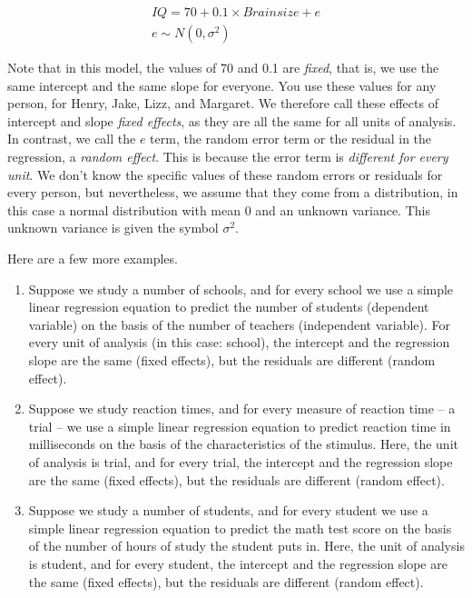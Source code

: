 \documentclass[]{book}\usepackage[]{graphicx}\usepackage[]{color}
\begin{document}
\begin{eqnarray}
IQ = 70 + 0.1 \times Brainsize + e \\
e \sim N(0, \sigma^2)
\end{eqnarray}

Note that in this model, the values of 70 and 0.1 are \textit{fixed}, that is, we use the same intercept and the same slope for everyone. You use these values for any person, for Henry, Jake, Lizz, and Margaret. We therefore call these effects of intercept and slope \textit{fixed effects}, as they are all the same for all units of analysis. In contrast, we call the $e$ term, the random error term or the residual in the regression, a \textit{random effect}. This is because the error term is \textit{different for every unit}. We don't know the specific values of these random errors or residuals for every person, but nevertheless, we assume that they come from a distribution, in this case a normal distribution with mean 0 and an unknown variance. This unknown variance is given the symbol $\sigma^2$. 

Here are a few more examples. 

\begin{enumerate}
\item Suppose we study a number of schools, and for every school we use a simple linear regression equation to predict the number of students (dependent variable) on the basis of the number of teachers (independent variable). For every unit of analysis (in this case: school), the intercept and the regression slope are the same (fixed effects), but the residuals are different (random effect). 

\item Suppose we study reaction times, and for every measure of reaction time -- a trial -- we use a simple linear regression equation to predict reaction time in milliseconds on the basis of the characteristics of the stimulus. Here, the unit of analysis is trial, and for every trial, the intercept and the regression slope are the same (fixed effects), but the residuals are different (random effect).

\item Suppose we study a number of students, and for every student we use a simple linear regression equation to predict the math test score on the basis of the number of hours of study the student puts in. Here, the unit of analysis is student, and for every student, the  intercept and the regression slope are the same (fixed effects), but the residuals are different (random effect).


\end{enumerate}
\end{document}
